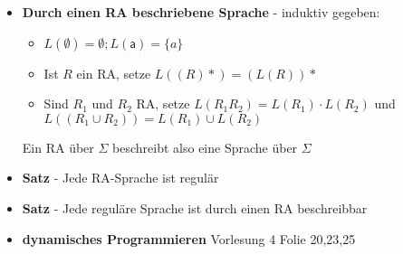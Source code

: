 \documentclass[12pt, a4paper]{article}
\begin{document}
\begin{itemize}
		\item \textbf{Durch einen RA beschriebene Sprache} - induktiv gegeben:
		\begin{itemize}
			\item $L(\emptyset)=\emptyset;L(\mathsf{a})=\{a\}$
			\item Ist $R$ ein RA, setze $L((R)*)=(L(R))*$
			\item Sind $R_{1}$ und $R_{2}$ RA, setze $L(R_{1}R_{2})=L(R_{1})\cdot L(R_{2})$ und $L((R_{1}\cup R_{2}))=L(R_{1})\cup L(R_{2})$
		\end{itemize}
		Ein RA über $\Sigma$ beschreibt also eine Sprache über $\Sigma$
		
		\item \textbf{Satz} - Jede RA-Sprache ist regulär
		
		\item \textbf{Satz} - Jede reguläre Sprache ist durch einen RA beschreibbar
		
		\item \textbf{dynamisches Programmieren} Vorlesung 4 Folie 20,23,25
		
	\end{itemize}
\end{document}
